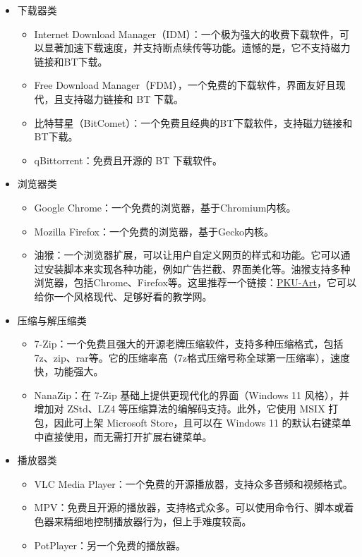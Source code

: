 \begin{itemize}
  \item 下载器类
    \begin{itemize}
      \item Internet Download Manager（IDM）：一个极为强大的收费下载软件，可以显著加速下载速度，并支持断点续传等功能。遗憾的是，它不支持磁力链接和BT下载。
      \item Free Download Manager（FDM），一个免费的下载软件，界面友好且现代，且支持磁力链接和 BT 下载。
      \item 比特彗星（BitComet）：一个免费且经典的BT下载软件，支持磁力链接和BT下载。
      \item qBittorrent：免费且开源的 BT 下载软件。
    \end{itemize}
  \item 浏览器类
    \begin{itemize}
      \item Google Chrome：一个免费的浏览器，基于Chromium内核。
      \item Mozilla Firefox：一个免费的浏览器，基于Gecko内核。
      \item 油猴：一个浏览器扩展，可以让用户自定义网页的样式和功能。它可以通过安装脚本来实现各种功能，例如广告拦截、界面美化等。油猴支持多种浏览器，包括Chrome、Firefox等。这里推荐一个链接：\href{https://github.com/zhuozhiyongde/PKU-Art}{PKU-Art}，它可以给你一个风格现代、足够好看的教学网。
    \end{itemize}
  \item 压缩与解压缩类
    \begin{itemize}
      \item 7-Zip：一个免费且强大的开源老牌压缩软件，支持多种压缩格式，包括7z、zip、rar等。它的压缩率高（7z格式压缩号称全球第一压缩率），速度快，功能强大。
      \item NanaZip：在 7-Zip 基础上提供更现代化的界面（Windows 11 风格），并增加对 ZStd、LZ4 等压缩算法的编解码支持。此外，它使用 MSIX 打包，因此可上架 Microsoft Store，且可以在 Windows 11 的默认右键菜单中直接使用，而无需打开扩展右键菜单。
    \end{itemize}
  \item 播放器类
    \begin{itemize}
      \item VLC Media Player：一个免费的开源播放器，支持众多音频和视频格式。
      \item MPV：免费且开源的播放器，支持格式众多。可以使用命令行、脚本或着色器来精细地控制播放器行为，但上手难度较高。
      \item PotPlayer：另一个免费的播放器。

\end{itemize}
\end{itemize}
